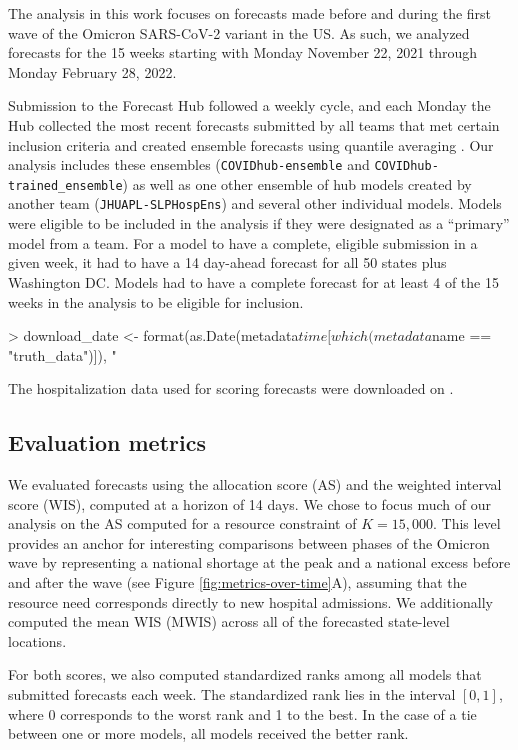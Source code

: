 \documentclass{article}
\begin{document}
The analysis in this work focuses on forecasts made before and during the first wave of the Omicron SARS-CoV-2 variant
in the US. As such, we analyzed forecasts for the 15 weeks starting with Monday November 22, 2021 through Monday
February 28, 2022.

Submission to the Forecast Hub followed a weekly cycle, and each Monday the Hub collected the most recent forecasts
submitted by all teams that met certain inclusion criteria and created ensemble forecasts using quantile averaging
\citep{ray_comparing_2023}. Our analysis includes these ensembles (\texttt{COVIDhub-ensemble} and
\texttt{COVIDhub-trained\_ensemble}) as well as one other ensemble of hub models created by another team
(\texttt{JHUAPL-SLPHospEns}) and several other individual models. Models were eligible to be included in the analysis if
they were designated as a ``primary'' model from a team. For a model to have a complete, eligible submission in a given
week, it had to have a 14 day-ahead forecast for all 50 states plus Washington DC. Models had to have a complete
forecast for at least 4 of the 15 weeks in the analysis to be eligible for inclusion.

\begin{Schunk}
\begin{Sinput}
> download_date <- format(as.Date(metadata$time[which(metadata$name == "truth_data")]), "%
\end{Sinput}
\end{Schunk}

The hospitalization data used for scoring forecasts were downloaded on .

\subsection{Evaluation metrics}

We evaluated forecasts using the allocation score (AS) and the weighted interval score (WIS), computed at a horizon of
14 days. We chose to focus much of our analysis on the AS computed for a resource constraint of $K=15,000$. This level
provides an anchor for interesting comparisons between phases of the Omicron wave by representing a national shortage at
the peak and a national excess before and after the wave (see Figure \ref{fig:metrics-over-time}A), assuming that the
resource need corresponds directly to new hospital admissions. We additionally computed the mean WIS (MWIS) across all
of the forecasted state-level locations. 

For both scores, we also computed standardized ranks among all models that submitted forecasts each week. The
standardized rank lies in the interval $[0, 1]$, where 0 corresponds to the worst rank and 1 to the best. In the case of
a tie between one or more models, all models received the better rank.
\end{document}
